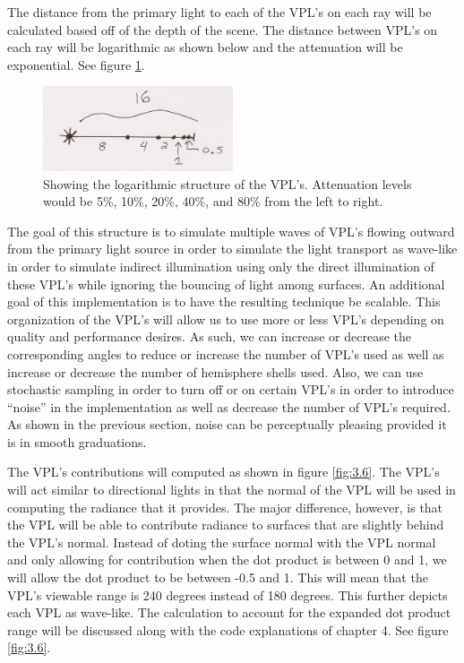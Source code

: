 The distance from the primary light to each of the VPL's on each ray will be calculated based off of the depth of the scene.  The distance between VPL's on each ray will be logarithmic as shown below and the attenuation will be exponential.  See figure \ref{fig:3.5}.

\begin{figure}[h!]
  \centering
    \includegraphics[width=0.5\textwidth]{Figure35.jpg}
  \caption{Showing the logarithmic structure of the VPL's.  Attenuation levels would be 5\%, 10\%, 20\%, 40\%, and 80\% from the left to right.}
	\label{fig:3.5}
\end{figure}

The goal of this structure is to simulate multiple waves of VPL's flowing outward from the primary light source in order to simulate the light transport as wave-like in order to simulate indirect illumination using only the direct illumination of these VPL's while ignoring the bouncing of light among surfaces.  An additional goal of this implementation is to have the resulting technique be scalable.  This organization of the VPL's will allow us to use more or less VPL's depending on quality and performance desires.  As such, we can increase or decrease the corresponding angles to reduce or increase the number of VPL's used as well as increase or decrease the number of hemisphere shells used.  Also, we can use stochastic sampling in order to turn off or on certain VPL's in order to introduce “noise” in the implementation as well as decrease the number of VPL's required.  As shown in the previous section, noise can be perceptually pleasing provided it is in smooth graduations.

The VPL's contributions will computed as shown in figure \ref{fig:3.6}.  The VPL's will act similar to directional lights in that the normal of the VPL will be used in computing the radiance that it provides.  The major difference, however, is that the VPL will be able to contribute radiance to surfaces that are slightly behind the VPL's normal.  Instead of doting the surface normal with the VPL normal and only allowing for contribution when the dot product is between 0 and 1, we will allow the dot product to be between -0.5 and 1.  This will mean that the VPL's viewable range is 240 degrees instead of 180 degrees.  This further depicts each VPL as wave-like.  The calculation to account for the expanded dot product range will be discussed along with the code explanations of chapter 4.  See figure \ref{fig:3.6}.


